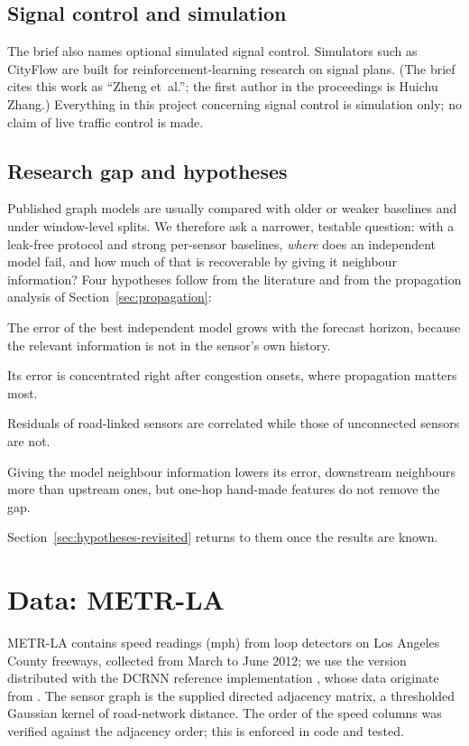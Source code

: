 \documentclass[11pt,a4paper]{article}
\begin{document}
\subsection{Signal control and simulation}
The brief also names optional simulated signal control.
Simulators such as CityFlow \citep{zhang2019cityflow} are built for reinforcement-learning research on signal plans. (The brief cites this work as ``Zheng et~al.''; the first author in the proceedings is Huichu Zhang.)
Everything in this project concerning signal control is simulation only; no claim of live traffic control is made.

\subsection{Research gap and hypotheses}\label{sec:hypotheses}
Published graph models are usually compared with older or weaker baselines and under window-level splits.
We therefore ask a narrower, testable question: with a leak-free protocol and strong per-sensor baselines, \emph{where} does an independent model fail, and how much of that is recoverable by giving it neighbour information?
Four hypotheses follow from the literature and from the propagation analysis of Section~\ref{sec:propagation}:
\begin{description}[leftmargin=1.2cm,labelwidth=1cm]
  \item[H1] The error of the best independent model grows with the forecast horizon, because the relevant information is not in the sensor's own history.
  \item[H2] Its error is concentrated right after congestion onsets, where propagation matters most.
  \item[H3] Residuals of road-linked sensors are correlated while those of unconnected sensors are not.
  \item[H4] Giving the model neighbour information lowers its error, downstream neighbours more than upstream ones, but one-hop hand-made features do not remove the gap.
\end{description}
Section~\ref{sec:hypotheses-revisited} returns to them once the results are known.

\section{Data: METR-LA}\label{sec:data}
METR-LA contains speed readings (mph) from loop detectors on Los Angeles County freeways, collected from March to June 2012; we use the version distributed with the DCRNN reference implementation \citep{li2018dcrnn}, whose data originate from \citet{jagadish2014bigdata}.
The sensor graph is the supplied directed adjacency matrix, a thresholded Gaussian kernel of road-network distance.
The order of the speed columns was verified against the adjacency order; this is enforced in code and tested.
\begin{table}[ht]
\centering\small

\caption{Dataset facts (computed in the exploratory analysis, \texttt{results/phase1\_findings.json}).}
\label{tab:dataset}
\end{table}
\end{document}
